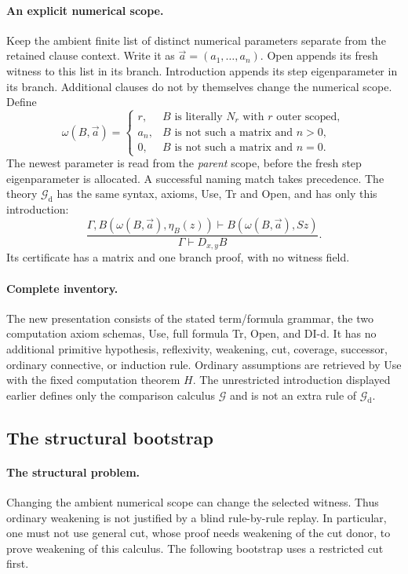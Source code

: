 \paragraph{An explicit numerical scope.}
Keep the ambient finite list of distinct numerical parameters separate from
the retained clause context. Write it as $\vec a=(a_1,\ldots,a_n)$.
Open appends its fresh witness to this list in its branch. Introduction appends
its step eigenparameter in its branch. Additional clauses do not by themselves
change the numerical scope. Define
\[
 \omega(B,\vec a)=
 \begin{cases}
 r,&B\text{ is literally }N_r\text{ with }r\text{ outer scoped},\\
 a_n,&B\text{ is not such a matrix and }n>0,\\
 0,&B\text{ is not such a matrix and }n=0.
 \end{cases}                                             \tag{DW}
\]
The newest parameter is read from the \emph{parent} scope, before the fresh
step eigenparameter is allocated. A successful naming match takes precedence.
The theory $\mathcal G_{\mathrm d}$ has the same syntax, axioms, Use, Tr and
Open, and has only this introduction:
\[
 \frac{\Gamma,B(\omega(B,\vec a),\eta_B(z))
              \vdash B(\omega(B,\vec a),Sz)}
      {\Gamma\vdash D_{x,y}B}.                           \tag{DI-d}
\]
Its certificate has a matrix and one branch proof, with no witness field.


\paragraph{Complete inventory.}
The new presentation consists of the stated term/formula grammar, the two
computation axiom schemas, Use, full formula Tr, Open, and DI-d. It has no
additional primitive hypothesis, reflexivity, weakening, cut, coverage,
successor, ordinary connective, or induction rule. Ordinary assumptions are
retrieved by Use with the fixed computation theorem $H$. The unrestricted
introduction displayed earlier defines only the comparison calculus
$\mathcal G$ and is not an extra rule of $\mathcal G_{\mathrm d}$.

\subsection{The structural bootstrap}

\paragraph{The structural problem.}
Changing the ambient numerical scope can change the selected witness. Thus
ordinary weakening is not justified by a blind rule-by-rule replay. In
particular, one must not use general cut, whose proof needs weakening of the
cut donor, to prove weakening of this calculus. The following bootstrap uses
a restricted cut first.

